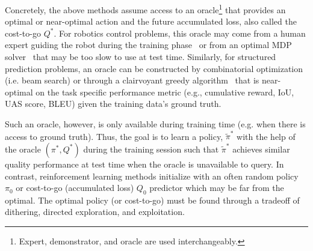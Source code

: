 \documentclass{article}
\begin{document}
Concretely, the above methods assume access to an oracle\footnote{Expert, demonstrator, and oracle are used interchangeably.} that provides an optimal or near-optimal action and the future accumulated loss, also called the cost-to-go $Q^*$. For robotics control problems, this oracle may come from a human expert guiding the robot during the training phase~ \cite{abbeel2010autonomous,mulling2013learning} or from an optimal MDP solver~\cite{Ross2011_AISTATS,kahn2016plato} that may be too slow to use at test time. Similarly, for structured prediction problems, an oracle can be constructed by combinatorial optimization (i.e. beam search) or through a clairvoyant greedy algorithm~\cite{daume2009search,ross2013contextual,rhinehart2015visual,chang2015learning_dependency} that is near-optimal on the task specific performance metric (e.g., cumulative reward, IoU, UAS score, BLEU) given the training data's ground truth.

Such an oracle, however, is only available during training time (e.g. when there is access to ground truth). Thus, the goal is to learn a policy, $\tilde \pi^*$ with the help of the oracle $(\pi^*, Q^*)$ during the training session such that $\tilde \pi^*$ achieves similar quality performance at test time when the oracle is unavailable to query. In contrast, reinforcement learning methods initialize with an often random policy $\pi_0$ or cost-to-go (accumulated loss) $Q_0$ predictor which may be far from the optimal. The optimal policy (or cost-to-go) must be found through a tradeoff of dithering, directed exploration, and exploitation.

\end{document}
